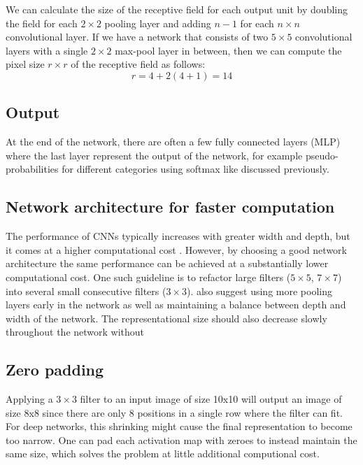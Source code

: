 We can calculate the size of the receptive field for each output unit by doubling the field for each $2 \times 2$ pooling layer and adding $n-1$ for each $n \times n$ convolutional layer.
If we have a network that consists of two $5 \times 5$ convolutional layers with a single $2 \times 2$ max-pool layer in between, then we can compute the pixel size $r \times r$ of the receptive field as follows:
\[
r = 4 + 2(4 + 1) = 14
\]

\subsection{Output}
At the end of the network, there are often a few fully connected layers (MLP) where the last layer represent the output of the network, for example pseudo-probabilities for different categories using softmax like discussed previously.

\subsection{Network architecture for faster computation}

The performance of CNNs typically increases with greater width and depth, but it comes at a higher computational cost \cite{InceptionV3}. However, by choosing a good network architecture the same performance can be achieved at a substantially lower computational cost. One such guideline is to refactor large filters ($5 \times 5$, $7 \times 7$) into several small consecutive filters ($3 \times 3$). \textcite{InceptionV3} also suggest using more pooling layers early in the network as well as maintaining a balance between depth and width of the network. The representational size should also decrease slowly throughout the network without


\subsection{Zero padding}

Applying a $3 \times 3$ filter to an input image of size 10x10 will output an image of size 8x8 since there are only 8 positions in a single row where the filter can fit. For deep networks, this shrinking might cause the final representation to become too narrow.
One can pad each activation map with zeroes to instead maintain the same size, which solves the problem at little additional computional cost.

